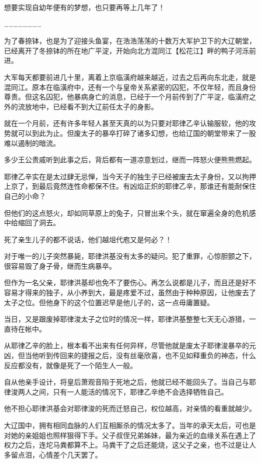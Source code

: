想要实现自幼年便有的梦想，也只要再等上几年了！

……………………

为了春捺钵，也是为了迎接头鱼宴，在浩浩荡荡的十数万大军护卫下的大辽朝堂，已经离开了冬捺钵的所在地广平淀，开始向北方混同江【松花江】畔的鸭子河泺前进。

大军每天都要前进几十里，离着上京临潢府越来越近，过去之后再向东北走，就是混同江。原本在临潢府中，还有一个与皇帝关系紧密的囚犯，不仅年轻，而且身份尊贵。但这名囚犯，他暴病身亡的消息，已经于一个月前传到了广平淀，临潢府之外的流放地中，已经看不到大辽前任太子的身影。

就在一个月前，还有许多年轻人甚至天真的以为只要对耶律乙辛认输服软，他的攻势就可以到此为止。但废太子的暴卒打碎了诸多幻想，也给辽国的朝堂带来了一股难以遏制的暗流。

多少王公贵戚听到此事之后，背后都有一道凉意划过，继而一阵怒火便熊熊燃起。

耶律乙辛实在是太过肆无忌惮，当今天子的独生子已经被废去太子身份，又以拘押上京了，到最后竟然连性命都保不住。有凶焰正炽的耶律乙辛，那谁还有能耐保住自己的小命？

但他们的这点怒火，却如同草原上的兔子，只冒出来个头，就在窜遍全身的危机感中给缩回了洞去。

死了亲生儿子的都不说话，他们越俎代庖又是何必？！

对于唯一的儿子突然暴毙，耶律洪基没有太多的疑问。犯了重罪，心惊胆颤之下，很容易毁了身子骨，继而生病暴卒。

但作为一名父亲，耶律洪基却也免不了要伤心。再怎么说都是儿子，而且还是好不容易才得来的独子，从小养到大，最是疼爱不过，虽然由于种种原因，让他废去了太子之位。但他身下的这个位置迟早是他儿子的，这一点毋庸置疑。

当日，又是跟废掉耶律浚太子之位时的情况一样，耶律洪基整整七天无心游猎，一直待在帐中。

从耶律乙辛的脸上，根本看不出来有任何异样，尽管他就是废太子耶律浚暴卒的元凶，但当他听到传回来的捷报之后，没有丝毫欣喜，也不见如释重负的神态，什么反应都没有，就像是死了一个陌生人一般。

自从他亲手设计，将皇后萧观音陷于死地之后，他就已经不能回头了。当自己与耶律浚两人之间，只有一人能活的情况下，耶律乙辛绝不会选择牺牲自己。

他不担心耶律洪基会对耶律浚的死而迁怒自己，权位越高，对亲情的看重就越少。

大辽国中，拥有相同血脉的人们互相厮杀的情况太多了。当年的承天太后，可也是对她的亲姐姐也照样狠得下手。父子叔侄兄弟姊妹，最为亲近的血缘关系在遇上了权力之后，连坨马粪都算不上。马粪干了之后还能烧，这父子之亲，也不过是让人多留点泪，心情差个几天罢了。

